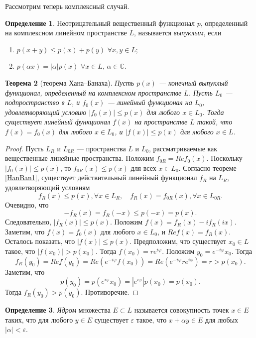 \documentclass[12pt, titlepage, oneside]{amsbook}
\newcommand{\CC}{\mathbb{C}}
\newtheorem{theorem}{Теорема}[chapter]
\theoremstyle{definition}
\newtheorem{definition}[theorem]{Определение}
\theoremstyle{remark}
\begin{document}
Рассмотрим теперь комплексный случай.

\begin{definition}
	Неотрицательный вещественный функционал $p$, определенный на комплексном линейном пространстве $L$, называется \emph{выпуклым}, если
	\begin{enumerate}
		\item $p(x+y)\leq p(x)+p(y)$ $\forall x,y\in L$;
		\item $p(\alpha x)=|\alpha| p(x)$ $\forall x\in L$, $\alpha\in\CC$.
	\end{enumerate}
\end{definition}

\begin{theorem}[теорема Хана--Банаха]
	\label{HanBan2}
	Пусть $p(x)$ --- конечный выпуклый функционал, определенный на комплексном пространстве $L$. Пусть $L_0$ --- подпространство в $L$, и $f_0(x)$ --- линейный функционал на $L_0$, удовлетворяющий условию $|f_0(x)|\leq p(x)$ для любого $x\in L_0$. Тогда существует линейный функционал $f(x)$ на пространстве $L$ такой, что $f(x)=f_0(x)$ для любого $x\in L_0$, и $|f(x)|\leq p(x)$ для любого $x\in L$.
\end{theorem}

\begin{proof}
	Пусть $L_R$ и $L_{0R}$ --- пространства $L$ и $L_0$, рассматриваемые как вещественные линейные пространства. Положим $f_{0R}= Re f_0(x)$. Поскольку $|f_0(x)|\leq p(x)$, то $f_{0R}(x)\leq p(x)$ для всех $x\in L_0$. Согласно теореме \ref{HanBan1}, существует  действительный линейный функционал $f_R$ на $L_R$, удовлетворяющий условиям $$f_R(x)\leq p(x),\forall x\in L_R,\quad f_R(x)=f_{0R}(x),\forall x\in L_{0R}.$$ Очевидно, что $$-f_R(x)=f_R(-x)\leq p(-x)=p(x).$$ Следовательно, $|f_R(x)|\leq p(x)$. Положим $f(x)=f_R(x)-if_R(ix)$. Заметим, что $f(x)=f_0(x)$ для любого $x\in L_0$, и $Re f(x)=f_R(x)$. Осталось показать, что $|f(x)|\leq p(x)$.  Предположим, что существует $x_0\in L$ такое, что $|f(x_0)|>p(x_0)$. Тогда $f(x_0)=re^{i\varphi}$. Положим $y_0=e^{-i\varphi}x_0$. Тогда $$f_R(y_0)=Re f(y_0)=Re(e^{-i\varphi}f(x_0))=Re(e^{-i\varphi}re^{i\varphi})=r>p(x_0).$$ Заметим, что $$p(y_0)=p(e^{i\varphi}x_0)=|e^{i\varphi}|p(x_0)=p(x_0).$$ Тогда $f_R(y_0)>p(y_0)$. Противоречие.
\end{proof}

\begin{definition}
	\emph{Ядром} множества $E\subset L$ называется совокупность точек $x\in E$ таких, что для любого $y\in E$ существует $\varepsilon$ такое, что $x+\alpha y\in E$ для любых $|\alpha|<\varepsilon$.
\end{definition}
\end{document}
